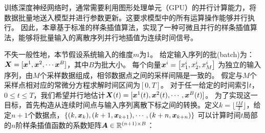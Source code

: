 训练深度神经网络时，通常需要利用图形处理单元（GPU）的并行计算能力，将数据批量地送入模型并进行参数更新。这要求模型中的所有运算操作能够并行执行。
因此，本章基于标准的样条插值算法，实现了一种可微且并行的样条插值算法，能够将批量输入的离散序列并行地插值为连续时间信号。

不失一般性地，本节假设系统输入的维度$m$为1。
给定输入序列的批(batch)为：
$\boldsymbol X = [\boldsymbol x ^1, \boldsymbol x ^2,\cdots\boldsymbol x^B]$，其中$B$为批大小。
每个向量$\boldsymbol x^i=\left[x_1^i, x_2^i, x_M ^i\right]$
为独立的输入序列，由$M$个采样数据组成，相邻数据点之间的采样间隔是一致的。
假定与$M$个采样点相对应的常微分方程求解时间区间为$[0,T]$。
对于任一给定的时间索引$t$，$0\leq t \leq T$，我们希望并行地估计$\boldsymbol X(t) = [\boldsymbol x ^1(t),\boldsymbol x ^2(t),\cdots,\boldsymbol x^B(t)]$。
为了实现这一目标，首先构造从连续时间点与输入序列离散下标之间的转换。定义$k=\lfloor \frac{tM}{T} \rfloor$，给定$n+1$个数据点，$\{(k, \boldsymbol x_k),(k+1, \boldsymbol x_{k+1}),\cdots,(k+n, \boldsymbol x_{k+n})\}$
可以计算时间$t$局部的$n$阶样条插值函数的系数矩阵$\boldsymbol A\in\mathbb{R}^{(n+1)\times B}$：

